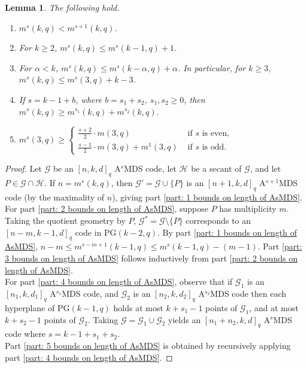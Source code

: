 \documentclass[11pt,a4paper]{amsart}
\newcommand{\AS}{ A$^s$MDS }
\newcommand{\G}{\mathcal{G}}
\theoremstyle{plain}
\newtheorem{lemma}[theorem]{Lemma}
\theoremstyle{definition}
\theoremstyle{remark}
\begin{document}
	\begin{lemma}\label{lem: bounds on length of AsMDS} The following hold.
		\begin{enumerate}
			\item $m^{s}(k,q)<m^{s+1}(k,q)$.  \label{part: 1 bounds on length of AsMDS}
			\item For $k\ge 2$, $m^{s}(k,q)\le m^{s}(k-1,q)+1$.  \label{part: 2 bounds on length of AsMDS}
			\item For $\alpha<k$, $m^{s}(k,q)\le m^{s}(k-\alpha,q)+\alpha$. In particular, for $k\ge 3$, $m^{s}(k,q)\le m^{s}(3,q)+k-3$.   \label{part: 3 bounds on length of AsMDS}
			\item %
			If $s=k-1+b$, where $b=s_1+s_2$, $s_1,s_2\ge 0$, then $m^s(k,q)\ge m^{s_1}(k,q)+m^{s_2}(k,q).$ \label{part: 4 bounds on length of AsMDS}
			\item $m^s(3,q)\ge \left\{ \begin{array}{ll}
				\frac{s+2}{2}\cdot  m(3,q)	& \text{ if $s$ is even, } \\
				\frac{s-1}{2}\cdot m(3,q) +m^1(3,q)	&  \text{ if $s$ is odd.}
			\end{array}\right. $ \label{part: 5 bounds on length of AsMDS}
		\end{enumerate}
	\end{lemma}
	\begin{proof}
		Let $\G$ be an $[n,k,d]_q$ \AS code, let $\mathcal{H}$ be a secant of $\G$, and let $P\in \G\cap \mathcal{H}$.   If $n=m^{s}(k,q)$, then  $\G'=\G\cup\{P\}$ is an $[n+1,k,d]_q$ A$^{s+1}$MDS code (by the maximality of $n$), giving part \ref{part: 1 bounds on length of AsMDS}.
		For part \ref{part: 2 bounds on length of AsMDS},  suppose $P$ has multiplicity $m$. Taking the quotient geometry by $P$, $\G^*=\G\setminus \{P\}$ corresponds to an $[n-m,k-1,d]_q$ code in  PG$(k-2,q)$. By part \ref{part: 1 bounds on length of AsMDS}, $n-m\le m^{s-m+1}(k-1,q)\le m^s(k-1,q)-(m-1)$. Part \ref{part: 3 bounds on length of AsMDS} follows inductively from part \ref{part: 2 bounds on length of AsMDS}.\\
		For part \ref{part: 4 bounds on length of AsMDS}, observe that if $\G_1$ is an $[n_1,k,d_1]_q$ A$^{s_1}$MDS code, and $\G_2$ is an $[n_2,k,d_2]_q$ A$^{s_2}$MDS code then each hyperplane of PG$(k-1,q)$ holds at most $k+s_1-1$ points of $\G_1$, and at most $k+s_2-1$ points of $\G_2$. Taking $\G=\G_1\cup\G_2$ yields an $[n_1+n_2,k,d]_q$ \AS code where $s=k-1+s_1+s_2$.\\
		Part \ref{part: 5 bounds on length of AsMDS} is obtained by recursively applying  part \ref{part: 4 bounds on length of AsMDS}.
	\end{proof}
\end{document}
